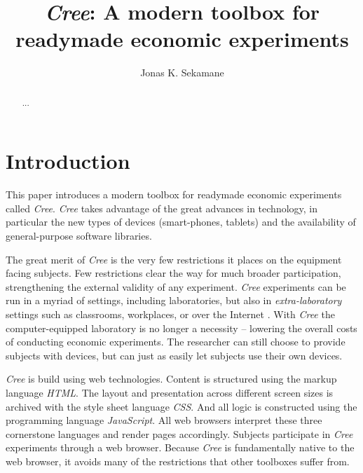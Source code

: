 \documentclass[preprint, 12pt]{elsarticle}
\newcommand{\Cree}{\emph{Cree}\xspace}
\begin{document}
\begin{frontmatter}

\title{\emph{Cree}: A modern toolbox for readymade economic experiments}
\author{Jonas K. Sekamane}

\begin{abstract}
{\color{red} ...}
\end{abstract}

\end{frontmatter}


\section{Introduction}
\label{S:Introduction}

This paper introduces a modern toolbox for readymade economic experiments called \Cree. \Cree takes advantage of the great advances in technology, in particular the new types of devices (smart-phones, tablets) and the availability of general-purpose software libraries. 

The great merit of \Cree is the very few restrictions it places on the equipment facing subjects. Few restrictions clear the way for much broader participation, strengthening the external validity of any experiment. \Cree experiments can be run in a myriad of settings, including laboratories, but also in \emph{extra-laboratory} settings such as classrooms, workplaces, or over the Internet \citep{Charness_Gneezy_Kuhn_2013}. With \Cree the computer-equipped laboratory is no longer a necessity -- lowering the overall costs of conducting economic experiments. The researcher can still choose to provide subjects with devices, but can just as easily let subjects use their own devices. 

\Cree is build using web technologies. Content is structured using the markup language \emph{HTML}. The layout and presentation across different screen sizes is archived with the style sheet language \emph{CSS}. And all logic is constructed using the programming language \emph{JavaScript}. All web browsers interpret these three cornerstone languages and render pages accordingly. Subjects participate in \Cree experiments through a web browser. Because \Cree is fundamentally native to the web browser, it avoids many of the restrictions that other toolboxes suffer from.
\end{document}
